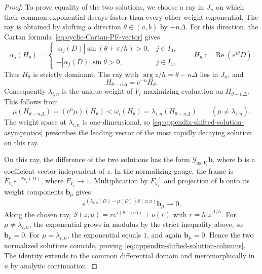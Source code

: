 \documentclass[11pt,leqno]{amsart}
\numberwithin{equation}{section}
\theoremstyle{plain}
\theoremstyle{definition}
\theoremstyle{plain}
\theoremstyle{definition}
\theoremstyle{remark}
\begin{document}
\begin{proof}
To prove equality of the two solutions, we choose a ray in $J_n$ on which their common exponential decays faster than every other weight exponential.  The ray is obtained by shifting a direction $\theta\in(a,b)$ by $-n\Delta$.  For this direction, the Cartan formula~\eqref{eq:cyclic-Cartan-PF-vector} gives
\[
 \alpha_j(H_\theta)=
 \begin{cases}
 |\alpha_j(D)|\sin(\theta+\pi/h)>0,&j\in I_0,\\
 -|\alpha_j(D)|\sin\theta>0,&j\in I_1,
 \end{cases}
 \qquad H_\theta:=\operatorname{Re}(e^{i\theta}D).
\]
Thus $H_\theta$ is strictly dominant.  The ray with $\arg z/h=\theta-n\Delta$ lies in $J_n$, and
\[
 H_{\theta-n\Delta}=c^{-n}H_\theta.
\]
Consequently $\lambda_{i,n}$ is the unique weight of $V_i$ maximizing evaluation on $H_{\theta-n\Delta}$.  This follows from
\[
 \mu(H_{\theta-n\Delta})=(c^n\mu)(H_\theta)
 <\omega_i(H_\theta)
 =\lambda_{i,n}(H_{\theta-n\Delta})
 \qquad(\mu\ne\lambda_{i,n}).
\]
The weight space at $\lambda_{i,n}$ is one-dimensional, so \eqref{eq:appendix-shifted-solution-asymptotics} prescribes the leading vector of the most rapidly decaying solution on this ray.

On this ray, the difference of the two solutions has the form $\mathcal Y_{\mathrm{as},V_i}\mathbf b$, where $\mathbf b$ is a coefficient vector independent of $z$.  In the normalizing gauge, the frame is $F_{V_i}e^{-S\rho_i(D)}$, where $F_{V_i}\to1$.  Multiplication by $F_{V_i}^{-1}$ and projection of $\mathbf b$ onto its weight components $\mathbf b_\mu$ gives
\[
 e^{(\lambda_{i,n}(D)-\mu(D))S(z;u)}\mathbf b_\mu\longrightarrow0.
\]
Along the chosen ray, $S(z;u)=re^{i(\theta-n\Delta)}+o(r)$ with $r=h|z|^{1/h}$.  For $\mu\ne\lambda_{i,n}$, the exponential grows in modulus by the strict inequality above, so $\mathbf b_\mu=0$.  For $\mu=\lambda_{i,n}$, the exponential equals $1$, and again $\mathbf b_\mu=0$.  Hence the two normalized solutions coincide, proving \eqref{eq:appendix-shifted-solution-columns}.  The identity extends to the common differential domain and meromorphically in $u$ by analytic continuation.
\end{proof}
\end{document}

